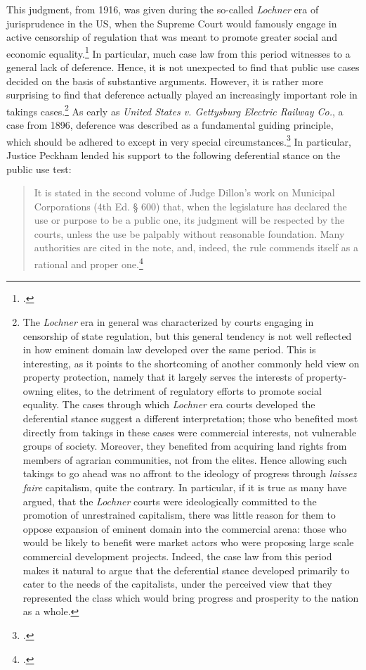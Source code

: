 \documentclass[12pt,a4paper]{book} %
\begin{document}
This judgment, from 1916, was given during the so-called {\it Lochner} era of jurisprudence in the US, when the Supreme Court  would famously engage in active censorship of regulation that was meant to promote greater social and economic equality.\footcite{cohen08} In particular, much case law from this period witnesses to a general lack of deference. Hence, it is not unexpected to find that public use cases decided on the basis of substantive arguments. However, it is rather more surprising to find that deference actually played an increasingly important role in takings cases.\footnote{The {\it Lochner} era in general was characterized by courts engaging in censorship of state regulation, but this general tendency is not well reflected in how eminent domain law developed over the same period. This is interesting, as it points to the shortcoming of another commonly held view on property protection, namely that it largely serves the interests of property-owning elites, to the detriment of regulatory efforts to promote social equality. The cases through which {\it Lochner} era courts developed the deferential stance suggest a different interpretation; those who benefited most directly from takings in these cases were commercial interests, not vulnerable groups of society. Moreover, they benefited from acquiring land rights from members of agrarian communities, not from the elites. Hence allowing such takings to go ahead was no affront to the ideology of progress through {\it laissez faire} capitalism, quite the contrary. In particular, if it is true as many have argued, that the {\it Lochner} courts were ideologically committed to the promotion of unrestrained capitalism, there was little reason for them to oppose expansion of eminent domain into the commercial arena: those who would be likely to benefit were market actors who were proposing large scale commercial development projects. Indeed, the case law from this period makes it natural to argue that the deferential stance developed primarily to cater to the needs of the capitalists, under the perceived view that they represented the class which would bring progress and prosperity to the nation as a whole.} As early as { \it United States v. Gettysburg Electric Railway Co.}, a case from 1896, deference was described as a fundamental guiding principle, which should be adhered to except in very special circumstances.\footcite{gettysburg96} In particular, Justice Peckham lended his support to the following deferential stance on the public use test:

\begin{quote}
It is stated in the second volume of Judge Dillon's work on Municipal Corporations (4th Ed. § 600) that, when the legislature has declared the use or purpose to be a public one, its judgment will be respected by the courts, unless the use be palpably without reasonable foundation. Many authorities are cited in the note, and, indeed, the rule commends itself as a rational and proper one.\footcite[680]{gettysburg96}
\end{quote}
\end{document}
